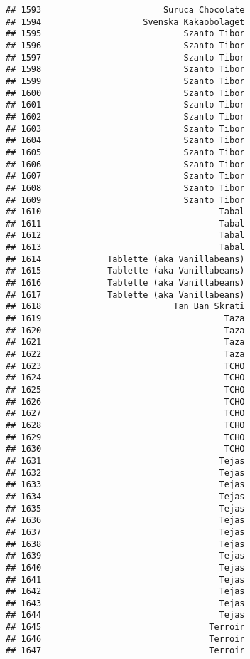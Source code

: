 \documentclass[
]{article}
\begin{document}
\begin{verbatim}
## 1593                        Suruca Chocolate
## 1594                    Svenska Kakaobolaget
## 1595                            Szanto Tibor
## 1596                            Szanto Tibor
## 1597                            Szanto Tibor
## 1598                            Szanto Tibor
## 1599                            Szanto Tibor
## 1600                            Szanto Tibor
## 1601                            Szanto Tibor
## 1602                            Szanto Tibor
## 1603                            Szanto Tibor
## 1604                            Szanto Tibor
## 1605                            Szanto Tibor
## 1606                            Szanto Tibor
## 1607                            Szanto Tibor
## 1608                            Szanto Tibor
## 1609                            Szanto Tibor
## 1610                                   Tabal
## 1611                                   Tabal
## 1612                                   Tabal
## 1613                                   Tabal
## 1614             Tablette (aka Vanillabeans)
## 1615             Tablette (aka Vanillabeans)
## 1616             Tablette (aka Vanillabeans)
## 1617             Tablette (aka Vanillabeans)
## 1618                          Tan Ban Skrati
## 1619                                    Taza
## 1620                                    Taza
## 1621                                    Taza
## 1622                                    Taza
## 1623                                    TCHO
## 1624                                    TCHO
## 1625                                    TCHO
## 1626                                    TCHO
## 1627                                    TCHO
## 1628                                    TCHO
## 1629                                    TCHO
## 1630                                    TCHO
## 1631                                   Tejas
## 1632                                   Tejas
## 1633                                   Tejas
## 1634                                   Tejas
## 1635                                   Tejas
## 1636                                   Tejas
## 1637                                   Tejas
## 1638                                   Tejas
## 1639                                   Tejas
## 1640                                   Tejas
## 1641                                   Tejas
## 1642                                   Tejas
## 1643                                   Tejas
## 1644                                   Tejas
## 1645                                 Terroir
## 1646                                 Terroir
## 1647                                 Terroir

\end{verbatim}
\end{document}
